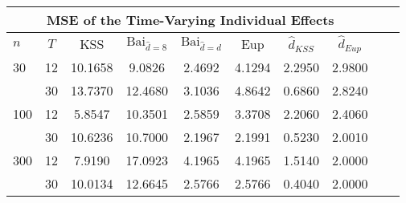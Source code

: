\begin{tabular}{lccccccccc} 
\hline \multicolumn{8}{c}{MSE of the Time-Varying Individual Effects} \\ \hline 
$n$ & $T$ & KSS & $ \text{Bai}_{\hat{d} = 8}$ & $\text{Bai}_{\hat{d} = d}$ & Eup & $\hat{d}_{KSS}$ & $\hat{d}_{Eup}$ \\
\hline
30 & 12 &  10.1658  &  9.0826  &  2.4692  &  4.1294  &  2.2950  &  2.9800  \\
& 30 &  13.7370  &  12.4680  &  3.1036  &  4.8642  &  0.6860  &  2.8240  \\
100 & 12 &  5.8547  &  10.3501  &  2.5859  &  3.3708  &  2.2060  &  2.4060  \\
& 30 &  10.6236  &  10.7000  &  2.1967  &  2.1991  &  0.5230  &  2.0010  \\
300 & 12 &  7.9190  &  17.0923  &  4.1965  &  4.1965  &  1.5140  &  2.0000  \\
& 30 &  10.0134  &  12.6645  &  2.5766  &  2.5766  &  0.4040  &  2.0000  \\
\end{tabular} 
